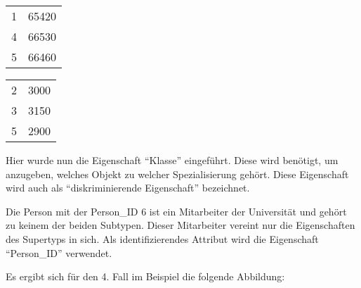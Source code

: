           \begin{supertabular}[h]{lp{5cm}}
            1 & 65420\\
            4 & 66530\\
            5 & 66460\\
          \end{supertabular}
          \begin{supertabular}[h]{lp{5cm}}
            2 & 3000\\
            3 & 3150\\
            5 & 2900\\
          \end{supertabular}

          Hier wurde nun die Eigenschaft \enquote{Klasse} eingef\"uhrt. Diese wird ben\"otigt, um anzugeben, welches Objekt zu welcher Spezialisierung geh\"ort. Diese Eigenschaft wird auch als \enquote{diskriminierende Eigenschaft} bezeichnet.

          Die Person mit der Person\_ID 6 ist ein Mitarbeiter der Universit\"at und geh\"ort zu keinem der beiden Subtypen. Dieser Mitarbeiter vereint nur die Eigenschaften des Supertyps in sich. Als identifizierendes Attribut wird die Eigenschaft \enquote{Person\_ID} verwendet.

          Es ergibt sich f\"ur den 4. Fall im Beispiel die folgende Abbildung:

          \begin{center}
          \end{center}


